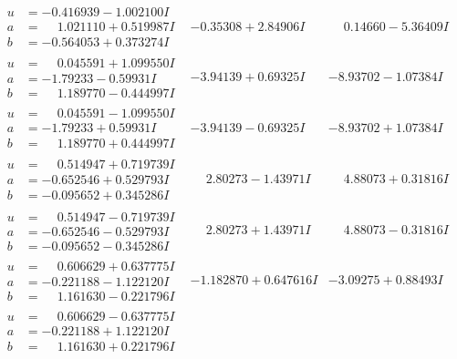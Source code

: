 \documentclass[1p]{elsarticle_modified}
\theoremstyle{definition}
\begin{document}
$$\begin{array}{c|c|c}
\begin{aligned}
u &= -0.416939 - 1.002100 I \\
a &= \phantom{-}1.021110 + 0.519987 I \\
b &= -0.564053 + 0.373274 I\end{aligned}
 & -0.35308 + 2.84906 I & \phantom{-}0.14660 - 5.36409 I \\ \hline\begin{aligned}
u &= \phantom{-}0.045591 + 1.099550 I \\
a &= -1.79233 - 0.59931 I \\
b &= \phantom{-}1.189770 - 0.444997 I\end{aligned}
 & -3.94139 + 0.69325 I & -8.93702 - 1.07384 I \\ \hline\begin{aligned}
u &= \phantom{-}0.045591 - 1.099550 I \\
a &= -1.79233 + 0.59931 I \\
b &= \phantom{-}1.189770 + 0.444997 I\end{aligned}
 & -3.94139 - 0.69325 I & -8.93702 + 1.07384 I \\ \hline\begin{aligned}
u &= \phantom{-}0.514947 + 0.719739 I \\
a &= -0.652546 + 0.529793 I \\
b &= -0.095652 + 0.345286 I\end{aligned}
 & \phantom{-}2.80273 - 1.43971 I & \phantom{-}4.88073 + 0.31816 I \\ \hline\begin{aligned}
u &= \phantom{-}0.514947 - 0.719739 I \\
a &= -0.652546 - 0.529793 I \\
b &= -0.095652 - 0.345286 I\end{aligned}
 & \phantom{-}2.80273 + 1.43971 I & \phantom{-}4.88073 - 0.31816 I \\ \hline\begin{aligned}
u &= \phantom{-}0.606629 + 0.637775 I \\
a &= -0.221188 - 1.122120 I \\
b &= \phantom{-}1.161630 - 0.221796 I\end{aligned}
 & -1.182870 + 0.647616 I & -3.09275 + 0.88493 I \\ \hline\begin{aligned}
u &= \phantom{-}0.606629 - 0.637775 I \\
a &= -0.221188 + 1.122120 I \\
b &= \phantom{-}1.161630 + 0.221796 I\end{aligned}

\end{array}$$
\end{document}
